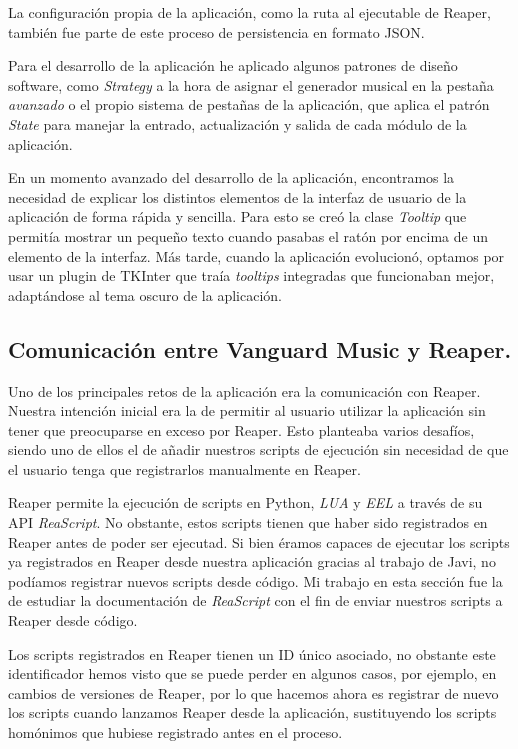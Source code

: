 La configuración propia de la aplicación, como la ruta al ejecutable de Reaper, también fue parte de este proceso de persistencia en formato JSON.

Para el desarrollo de la aplicación he aplicado algunos patrones de diseño software, como \textit{Strategy} a la hora de asignar el generador musical en la pestaña \textit{avanzado} o el propio sistema de pestañas de la aplicación, que aplica el patrón \textit{State} para manejar la entrado, actualización y salida de cada módulo de la aplicación.

En un momento avanzado del desarrollo de la aplicación, encontramos la necesidad de explicar los distintos elementos de la interfaz de usuario de la aplicación de forma rápida y sencilla. Para esto se creó la clase \textit{Tooltip} que permitía mostrar un pequeño texto cuando pasabas el ratón por encima de un elemento de la interfaz. Más tarde, cuando la aplicación evolucionó, optamos por usar un plugin de TKInter que traía \textit{tooltips} integradas que funcionaban mejor, adaptándose al tema oscuro de la aplicación.

\subsection*{Comunicación entre Vanguard Music y Reaper.}
Uno de los principales retos de la aplicación era la comunicación con Reaper. Nuestra intención inicial era la de permitir al usuario utilizar la aplicación sin tener que preocuparse en exceso por Reaper. Esto planteaba varios desafíos, siendo uno de ellos el de añadir nuestros scripts de ejecución sin necesidad de que el usuario tenga que registrarlos manualmente en Reaper. 

Reaper permite la ejecución de scripts en Python, \textit{LUA} y \textit{EEL} a través de su API \textit{ReaScript}. No obstante, estos scripts tienen que haber sido registrados en Reaper antes de poder ser ejecutad. Si bien éramos capaces de ejecutar los scripts ya registrados en Reaper desde nuestra aplicación gracias al trabajo de Javi, no podíamos registrar nuevos scripts desde código. Mi trabajo en esta sección fue la de estudiar la documentación de \textit{ReaScript} con el fin de enviar nuestros scripts a Reaper desde código. 

Los scripts registrados en Reaper tienen un ID único asociado, no obstante este identificador hemos visto que se puede perder en algunos casos, por ejemplo, en cambios de versiones de Reaper, por lo que hacemos ahora es registrar de nuevo los scripts cuando lanzamos Reaper desde la aplicación, sustituyendo los scripts homónimos que hubiese registrado antes en el proceso.




